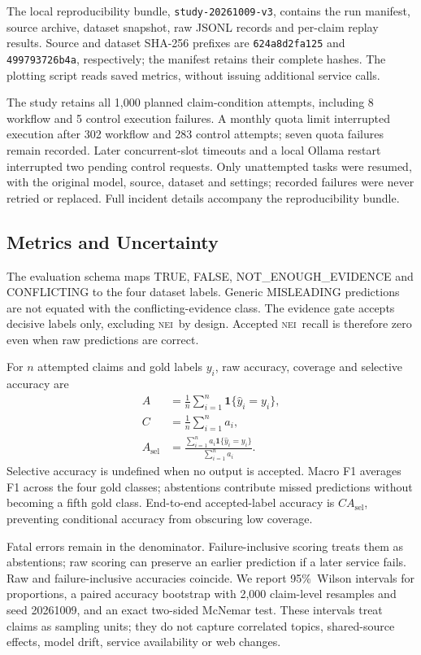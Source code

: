 \documentclass[conference]{IEEEtran}
\newcommand{\NEI}{\textsc{nei}}
\newcommand{\pct}{\%}
\begin{document}
The local reproducibility bundle, \texttt{study-20261009-v3}, contains the run manifest, source archive, dataset snapshot, raw JSONL records and per-claim replay results. Source and dataset SHA-256 prefixes are \texttt{624a8d2fa125} and \texttt{499793726b4a}, respectively; the manifest retains their complete hashes. The plotting script reads saved metrics, without issuing additional service calls.

The study retains all 1,000 planned claim-condition attempts, including 8 workflow and 5 control execution failures. A monthly quota limit interrupted execution after 302 workflow and 283 control attempts; seven quota failures remain recorded. Later concurrent-slot timeouts and a local Ollama restart interrupted two pending control requests. Only unattempted tasks were resumed, with the original model, source, dataset and settings; recorded failures were never retried or replaced. Full incident details accompany the reproducibility bundle.

\subsection{Metrics and Uncertainty}
The evaluation schema maps TRUE, FALSE, NOT\_ENOUGH\_EVIDENCE and CONFLICTING to the four dataset labels. Generic MISLEADING predictions are not equated with the conflicting-evidence class. The evidence gate accepts decisive labels only, excluding \NEI\ by design. Accepted \NEI\ recall is therefore zero even when raw predictions are correct.

For $n$ attempted claims and gold labels $y_i$, raw accuracy, coverage and selective accuracy are
\begin{align}
A &= \frac{1}{n}\sum_{i=1}^{n}\mathbf{1}\{\hat y_i=y_i\},\\
C &= \frac{1}{n}\sum_{i=1}^{n}a_i,\\
A_{\mathrm{sel}} &=
\frac{\sum_{i=1}^{n}a_i\mathbf{1}\{\hat y_i=y_i\}}
{\sum_{i=1}^{n}a_i}.
\end{align}
Selective accuracy is undefined when no output is accepted. Macro F1 averages F1 across the four gold classes; abstentions contribute missed predictions without becoming a fifth gold class. End-to-end accepted-label accuracy is $C A_{\mathrm{sel}}$, preventing conditional accuracy from obscuring low coverage.

Fatal errors remain in the denominator. Failure-inclusive scoring treats them as abstentions; raw scoring can preserve an earlier prediction if a later service fails. Raw and failure-inclusive accuracies coincide. We report 95\pct\ Wilson intervals for proportions, a paired accuracy bootstrap with 2,000 claim-level resamples and seed 20261009, and an exact two-sided McNemar test. These intervals treat claims as sampling units; they do not capture correlated topics, shared-source effects, model drift, service availability or web changes.
\end{document}
